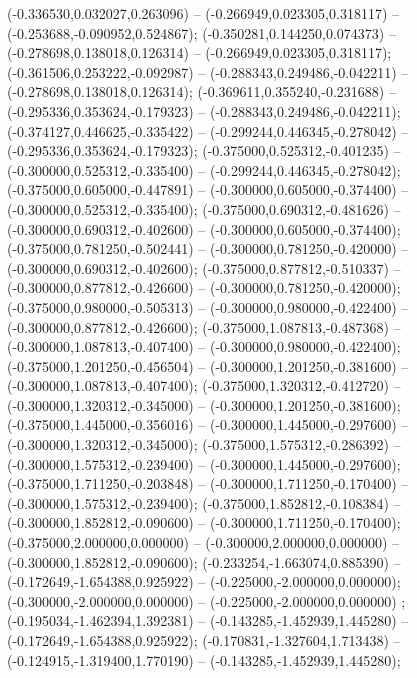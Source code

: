 (-0.336530,0.032027,0.263096) -- (-0.266949,0.023305,0.318117) -- (-0.253688,-0.090952,0.524867);
 (-0.350281,0.144250,0.074373) -- (-0.278698,0.138018,0.126314) -- (-0.266949,0.023305,0.318117);
 (-0.361506,0.253222,-0.092987) -- (-0.288343,0.249486,-0.042211) -- (-0.278698,0.138018,0.126314);
 (-0.369611,0.355240,-0.231688) -- (-0.295336,0.353624,-0.179323) -- (-0.288343,0.249486,-0.042211);
 (-0.374127,0.446625,-0.335422) -- (-0.299244,0.446345,-0.278042) -- (-0.295336,0.353624,-0.179323);
 (-0.375000,0.525312,-0.401235) -- (-0.300000,0.525312,-0.335400) -- (-0.299244,0.446345,-0.278042);
 (-0.375000,0.605000,-0.447891) -- (-0.300000,0.605000,-0.374400) -- (-0.300000,0.525312,-0.335400);
 (-0.375000,0.690312,-0.481626) -- (-0.300000,0.690312,-0.402600) -- (-0.300000,0.605000,-0.374400);
 (-0.375000,0.781250,-0.502441) -- (-0.300000,0.781250,-0.420000) -- (-0.300000,0.690312,-0.402600);
 (-0.375000,0.877812,-0.510337) -- (-0.300000,0.877812,-0.426600) -- (-0.300000,0.781250,-0.420000);
 (-0.375000,0.980000,-0.505313) -- (-0.300000,0.980000,-0.422400) -- (-0.300000,0.877812,-0.426600);
 (-0.375000,1.087813,-0.487368) -- (-0.300000,1.087813,-0.407400) -- (-0.300000,0.980000,-0.422400);
 (-0.375000,1.201250,-0.456504) -- (-0.300000,1.201250,-0.381600) -- (-0.300000,1.087813,-0.407400);
 (-0.375000,1.320312,-0.412720) -- (-0.300000,1.320312,-0.345000) -- (-0.300000,1.201250,-0.381600);
 (-0.375000,1.445000,-0.356016) -- (-0.300000,1.445000,-0.297600) -- (-0.300000,1.320312,-0.345000);
 (-0.375000,1.575312,-0.286392) -- (-0.300000,1.575312,-0.239400) -- (-0.300000,1.445000,-0.297600);
 (-0.375000,1.711250,-0.203848) -- (-0.300000,1.711250,-0.170400) -- (-0.300000,1.575312,-0.239400);
 (-0.375000,1.852812,-0.108384) -- (-0.300000,1.852812,-0.090600) -- (-0.300000,1.711250,-0.170400);
 (-0.375000,2.000000,0.000000) -- (-0.300000,2.000000,0.000000) -- (-0.300000,1.852812,-0.090600);
 (-0.233254,-1.663074,0.885390) -- (-0.172649,-1.654388,0.925922) -- (-0.225000,-2.000000,0.000000);
 (-0.300000,-2.000000,0.000000) -- (-0.225000,-2.000000,0.000000) ;
 (-0.195034,-1.462394,1.392381) -- (-0.143285,-1.452939,1.445280) -- (-0.172649,-1.654388,0.925922);
 (-0.170831,-1.327604,1.713438) -- (-0.124915,-1.319400,1.770190) -- (-0.143285,-1.452939,1.445280);
